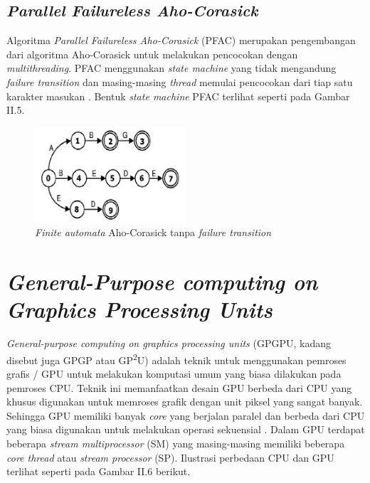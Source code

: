   \subsection {\emph{Parallel Failureless Aho-Corasick}}

    Algoritma \emph{Parallel Failureless Aho-Corasick} (PFAC) merupakan pengembangan dari algoritma Aho-Corasick untuk melakukan pencocokan dengan \emph{multithreading}. PFAC menggunakan \emph{state machine} yang tidak mengandung \emph{failure transition} dan masing-masing \emph{thread} memulai pencocokan dari tiap satu karakter masukan \citep{lin2013}. Bentuk \emph{state machine} PFAC terlihat seperti pada Gambar II.5.

    \begin{figure}[htb]
      \centering
      \includegraphics[width=0.5\textwidth]{resources/pfac.png}
      \caption[\emph{Finite automata} Aho-Corasick tanpa \emph{failure transition}]{\emph{Finite automata} Aho-Corasick tanpa \emph{failure transition} \citep{lin2013}}
    \end{figure}
    
\section{\emph{General-Purpose computing on Graphics Processing Units}}
  
  \emph{General-purpose computing on graphics processing units} (GPGPU, kadang disebut juga GPGP atau GP\textsuperscript{2}U) adalah teknik untuk menggunakan pemroses grafis / GPU untuk melakukan komputasi umum yang biasa dilakukan pada pemroses CPU. Teknik ini memanfaatkan desain GPU berbeda dari CPU yang khusus digunakan untuk memroses grafik dengan unit piksel yang sangat banyak. Sehingga GPU memiliki banyak \emph{core} yang berjalan paralel dan berbeda dari CPU yang biasa digunakan untuk melakukan operasi sekuensial \citep{lindholm2001}. Dalam GPU terdapat beberapa \emph{stream multiprocessor} (SM) yang masing-masing memiliki beberapa \emph{core thread} atau \emph{stream processor} (SP). Ilustrasi perbedaan CPU dan GPU terlihat seperti pada Gambar II.6 berikut.


